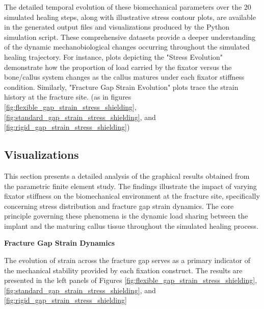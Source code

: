 \documentclass{article}
\begin{document}
The detailed temporal evolution of these biomechanical parameters over the 20 simulated healing steps, along with illustrative stress contour plots, are available in the generated output files and visualizations produced by the Python simulation script. These comprehensive datasets provide a deeper understanding of the dynamic mechanobiological changes occurring throughout the simulated healing trajectory. For instance, plots depicting the "Stress Evolution" demonstrate how the proportion of load carried by the fixator versus the bone/callus system changes as the callus matures under each fixator stiffness condition. Similarly, "Fracture Gap Strain Evolution" plots trace the strain history at the fracture site. (as in figures \ref{fig:flexible_gap_strain_stress_shielding}, \ref{fig:standard_gap_strain_stress_shielding}, and \ref{fig:rigid_gap_strain_stress_shielding})

\subsection{Visualizations}
This section presents a detailed analysis of the graphical results obtained from the parametric finite element study. The findings illustrate the impact of varying fixator stiffness on the biomechanical environment at the fracture site, specifically concerning stress distribution and fracture gap strain dynamics. The core principle governing these phenomena is the dynamic load sharing between the implant and the maturing callus tissue throughout the simulated healing process.

\textbf{Fracture Gap Strain Dynamics}

The evolution of strain across the fracture gap serves as a primary indicator of the mechanical stability provided by each fixation construct. The results are presented in the left panels of Figures \ref{fig:flexible_gap_strain_stress_shielding}, \ref{fig:standard_gap_strain_stress_shielding}, and \ref{fig:rigid_gap_strain_stress_shielding}
\end{document}
